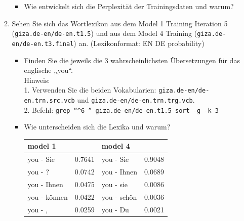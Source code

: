 \documentclass[12pt,fleqn]{article}
\begin{document}
\begin{enumerate}
\begin{enumerate}
\vspace{0.5cm} 
\begin{itemize} 
\item Wie entwickelt sich die Perplexität der Trainingsdaten und warum? 
\end{itemize} 

\item Sehen Sie sich das Wortlexikon aus dem Model 1 Training Iteration 5 (\texttt{giza.de-en/de-en.t1.5}) und aus dem Model 4 Training (\texttt{giza.de-en/de-en.t3.final}) an. 
(Lexikonformat: EN DE probability) 

\vspace{0.5cm} 
\begin{itemize} 
\item Finden Sie die jeweils die 3 wahrscheinlichsten Übersetzungen für das englische „you“. \\ 

Hinweis: \\ 
1. Verwenden Sie die beiden Vokabularien: \texttt{giza.de-en/de-en.trn.src.vcb} und \texttt{giza.de-en/de-en.trn.trg.vcb}.  \\
2. Befehl:  %
\texttt{grep ``\textasciicircum6 '' giza.de-en/de-en.t1.5 \textbar  sort -g -k 3} \\ 

\item Wie unterscheiden sich die Lexika und warum?


\begin{table}[h] 
 \begin{center} 
\begin{tabular}{|p{4cm}|l|p{4cm}|l|} \hline 
\multicolumn{2}{|p{6cm}|}{model 1} & \multicolumn{2}{|p{6cm}|}{model 4} \\ \hline 
you - Sie & 0.7641 & you - Sie  & 0.9048 \\ \hline 
you - ? & 0.0742 & you - Ihnen & 0.0689 \\ \hline 
you - Ihnen & 0.0475 & you - sie & 0.0086 \\ \hline 
you - können & 0.0422 & you - schön  & 0.0036 \\ \hline 
you - , & 0.0259 & you - Du  & 0.0021 \\ \hline 
\end{tabular}
 \end{center}
\end{table}


\end{itemize}
\end{enumerate}
\end{enumerate}
\end{document}
